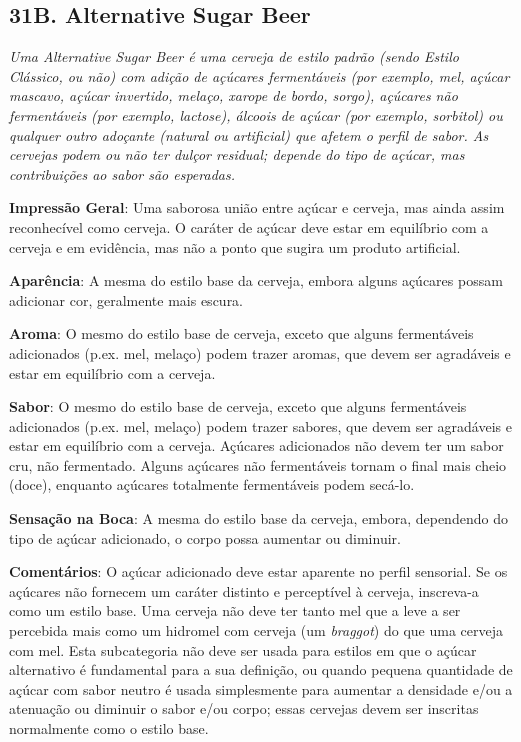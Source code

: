 \subsection*{31B. Alternative Sugar Beer}

\textit{Uma Alternative Sugar Beer é uma cerveja de estilo padrão (sendo Estilo Clássico, ou não) com adição de açúcares fermentáveis (por exemplo, mel, açúcar mascavo, açúcar invertido, melaço, xarope de bordo, sorgo), açúcares não fermentáveis (por exemplo, lactose), álcoois de açúcar (por exemplo, sorbitol) ou qualquer outro adoçante (natural ou artificial) que afetem o perfil de sabor. As cervejas podem ou não ter dulçor residual; depende do tipo de açúcar, mas contribuições ao sabor são esperadas.}

\textbf{Impressão Geral}: Uma saborosa união entre açúcar e cerveja, mas ainda assim reconhecível como cerveja. O caráter de açúcar deve estar em equilíbrio com a cerveja e em evidência, mas não a ponto que sugira um produto artificial.

\textbf{Aparência}: A mesma do estilo base da cerveja, embora alguns açúcares possam adicionar cor, geralmente mais escura.

\textbf{Aroma}: O mesmo do estilo base de cerveja, exceto que alguns fermentáveis adicionados (p.ex. mel, melaço) podem trazer aromas, que devem ser agradáveis e estar em equilíbrio com a cerveja.

\textbf{Sabor}: O mesmo do estilo base de cerveja, exceto que alguns fermentáveis adicionados (p.ex. mel, melaço) podem trazer sabores, que devem ser agradáveis e estar em equilíbrio com a cerveja. Açúcares adicionados não devem ter um sabor cru, não fermentado. Alguns açúcares não fermentáveis tornam o final mais cheio (doce), enquanto açúcares totalmente fermentáveis podem secá-lo.

\textbf{Sensação na Boca}: A mesma do estilo base da cerveja, embora, dependendo do tipo de açúcar adicionado, o corpo possa aumentar ou diminuir.

\textbf{Comentários}: O açúcar adicionado deve estar aparente no perfil sensorial. Se os açúcares não fornecem um caráter distinto e perceptível à cerveja, inscreva-a como um estilo base. Uma cerveja não deve ter tanto mel que a leve a ser percebida mais como um hidromel com cerveja (um \textit{braggot}) do que uma cerveja com mel. Esta subcategoria não deve ser usada para estilos em que o açúcar alternativo é fundamental para a sua definição, ou quando pequena quantidade de açúcar com sabor neutro é usada simplesmente para aumentar a densidade e/ou a atenuação ou diminuir o sabor e/ou corpo; essas cervejas devem ser inscritas normalmente como o estilo base.

